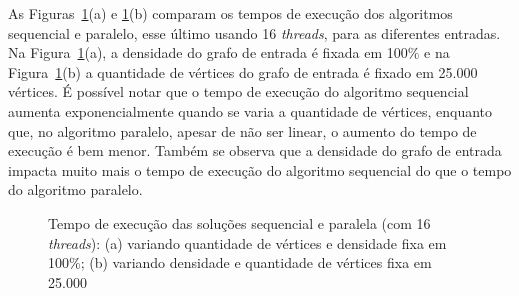 \documentclass[12pt]{article}
\begin{document}
As Figuras~\ref{fig:2}(a) e \ref{fig:2}(b) comparam os tempos de execução dos algoritmos sequencial e paralelo, esse último usando 16 \emph{threads}, para as diferentes entradas. Na Figura~\ref{fig:2}(a), a densidade do grafo de entrada é fixada em 100\% e na Figura~\ref{fig:2}(b) a quantidade de vértices do grafo de entrada é fixado em 25.000 vértices. É possível notar que o tempo de execução do algoritmo sequencial aumenta exponencialmente quando se varia a quantidade de vértices, enquanto que, no algoritmo paralelo, apesar de não ser linear, o aumento do tempo de execução é bem menor. Também se observa que a densidade do grafo de entrada impacta muito mais o tempo de execução do algoritmo sequencial do que o tempo do algoritmo paralelo.

\begin{figure}[!htb]
    \centering
    \begin{minipage}{.48\textwidth}
        \centering
        \resizebox{\textwidth}{!}
        {
		}
        \subcaption{}
    \end{minipage}\hfill%
    \begin{minipage}{.48\textwidth}
        \centering
        \resizebox{\textwidth}{!}
        {
		}
        \subcaption{}
    \end{minipage}
    \caption{Tempo de execução das soluções sequencial e paralela (com 16 \emph{threads}): (a) variando quantidade de vértices e densidade fixa em 100\%; (b) variando densidade e quantidade de vértices fixa em 25.000}
    \label{fig:2}
\end{figure}
\end{document}
